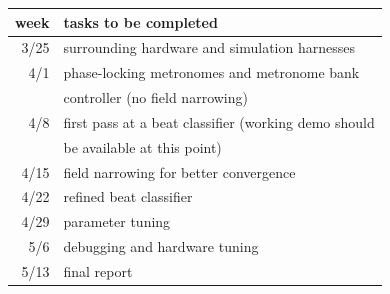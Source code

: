 \documentclass[letterpaper]{article}
\begin{document}
    \begin{table}[h!]
        \begin{center}
            \begin{tabular}{|rl|}
                \hline
                \textbf{week} & \textbf{tasks to be completed} \\
                \hline
                3/25 & surrounding hardware and simulation harnesses \\
                \hline
                4/1  & phase-locking metronomes and metronome bank \\
                     & controller (no field narrowing) \\
                \hline
                4/8  & first pass at a beat classifier (working demo should \\
                     & be available at this point) \\
                \hline
                4/15 & field narrowing for better convergence \\
                \hline
                4/22 & refined beat classifier \\
                \hline
                4/29 & parameter tuning \\
                \hline
                5/6  & debugging and hardware tuning \\
                \hline
                5/13  & final report \\
                \hline
            \end{tabular}
        \end{center}
        \label{tbl:sched}
    \end{table}
\end{document}
